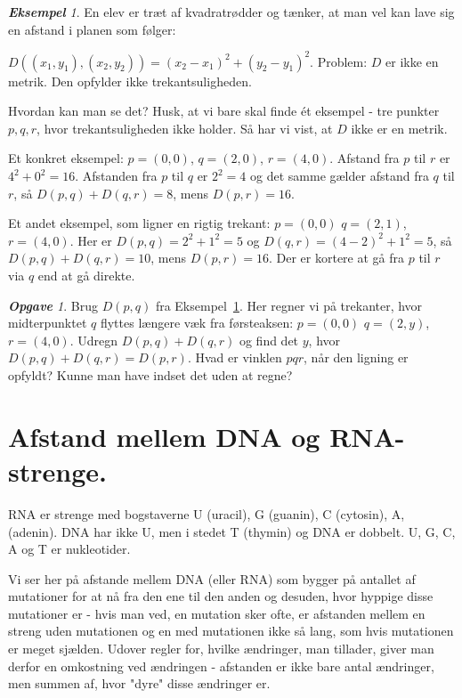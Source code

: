 \documentclass[a4paper, 12pt]{article}
\theoremstyle{remark}
\newtheorem{Eksempel}{\textbf{Eksempel}}
\newtheorem{Opgave}{\textbf{Opgave}}
\begin{document}
\begin{Eksempel}\label{ex:ikke-metrik} En elev er træt af kvadratrødder og tænker, at man vel kan lave sig en afstand i planen som følger:

 $D((x_1,y_1),(x_2,y_2))=(x_2-x_1)^2+(y_2-y_1)^2$. Problem: $D$ er ikke en metrik. Den opfylder ikke trekantsuligheden.

Hvordan kan man se det? Husk, at vi bare skal finde ét eksempel - tre punkter $p,q,r$, hvor trekantsuligheden ikke holder. Så har vi vist, at $D$ ikke er en metrik. 



Et konkret eksempel:  $p=(0,0)$, $q=(2,0)$, $r=(4,0)$. Afstand fra $p$ til $r$ er $4^2+0^2=16$. Afstanden fra $p$ til $q$ er $2^2=4$ og det samme gælder afstand fra $q$ til $r$, så $D(p,q)+D(q,r)=8$, mens $D(p,r)=16$.

Et andet eksempel, som ligner en rigtig trekant: $p=(0,0)$ $q=(2,1)$, $r=(4,0)$. Her er $D(p,q)=2^2+1^2=5$ og $D(q,r)=(4-2)^2+1^2=5$, så $D(p,q)+D(q,r)=10$, mens $D(p,r)=16$. Der er kortere at gå fra $p$ til $r$ via $q$ end at gå direkte. 


\end{Eksempel}
\begin{Opgave} Brug $D(p,q)$ fra Eksempel~\ref{ex:ikke-metrik}. Her regner vi på trekanter, hvor midterpunktet $q$ flyttes længere væk fra førsteaksen: $p=(0,0)$ $q=(2,y)$, $r=(4,0)$. Udregn $D(p,q)+D(q,r)$ og find det $y$, hvor $D(p,q)+D(q,r)=D(p,r)$. Hvad er vinklen $pqr$, når den ligning er opfyldt? Kunne man have indset det uden at regne?
\end{Opgave}
\section{ Afstand mellem DNA og RNA-strenge.} 
RNA er strenge med bogstaverne U (uracil), G (guanin), C (cytosin), A, (adenin). DNA har ikke U, men i stedet T (thymin) og DNA er dobbelt. U, G, C, A og T er nukleotider. 

Vi ser her på afstande mellem DNA (eller RNA) som bygger på antallet af mutationer for at nå fra den ene til den anden og desuden, hvor hyppige disse mutationer er - hvis man ved, en mutation sker ofte, er afstanden mellem en streng uden mutationen og en med mutationen ikke så lang, som hvis mutationen er meget sjælden. 
 Udover regler for, hvilke ændringer, man tillader, giver man derfor en omkostning ved ændringen - afstanden er ikke bare antal ændringer, men summen af, hvor "dyre" disse ændringer er.
\end{document}
